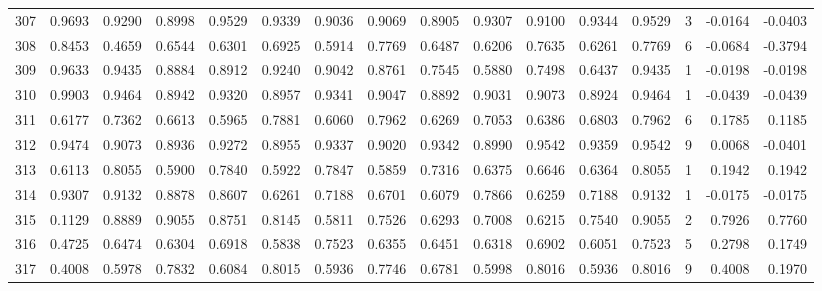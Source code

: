 \begin{tabular}{lrrrrrrrrrrrrrrr}
307 &      0.9693 &  0.9290 &  0.8998 &  0.9529 &  0.9339 &  0.9036 &  0.9069 &  0.8905 &  0.9307 &  0.9100 &   0.9344 &     0.9529 &      3 &                   -0.0164 &                    -0.0403 \\
308 &      0.8453 &  0.4659 &  0.6544 &  0.6301 &  0.6925 &  0.5914 &  0.7769 &  0.6487 &  0.6206 &  0.7635 &   0.6261 &     0.7769 &      6 &                   -0.0684 &                    -0.3794 \\
309 &      0.9633 &  0.9435 &  0.8884 &  0.8912 &  0.9240 &  0.9042 &  0.8761 &  0.7545 &  0.5880 &  0.7498 &   0.6437 &     0.9435 &      1 &                   -0.0198 &                    -0.0198 \\
310 &      0.9903 &  0.9464 &  0.8942 &  0.9320 &  0.8957 &  0.9341 &  0.9047 &  0.8892 &  0.9031 &  0.9073 &   0.8924 &     0.9464 &      1 &                   -0.0439 &                    -0.0439 \\
311 &      0.6177 &  0.7362 &  0.6613 &  0.5965 &  0.7881 &  0.6060 &  0.7962 &  0.6269 &  0.7053 &  0.6386 &   0.6803 &     0.7962 &      6 &                    0.1785 &                     0.1185 \\
312 &      0.9474 &  0.9073 &  0.8936 &  0.9272 &  0.8955 &  0.9337 &  0.9020 &  0.9342 &  0.8990 &  0.9542 &   0.9359 &     0.9542 &      9 &                    0.0068 &                    -0.0401 \\
313 &      0.6113 &  0.8055 &  0.5900 &  0.7840 &  0.5922 &  0.7847 &  0.5859 &  0.7316 &  0.6375 &  0.6646 &   0.6364 &     0.8055 &      1 &                    0.1942 &                     0.1942 \\
314 &      0.9307 &  0.9132 &  0.8878 &  0.8607 &  0.6261 &  0.7188 &  0.6701 &  0.6079 &  0.7866 &  0.6259 &   0.7188 &     0.9132 &      1 &                   -0.0175 &                    -0.0175 \\
315 &      0.1129 &  0.8889 &  0.9055 &  0.8751 &  0.8145 &  0.5811 &  0.7526 &  0.6293 &  0.7008 &  0.6215 &   0.7540 &     0.9055 &      2 &                    0.7926 &                     0.7760 \\
316 &      0.4725 &  0.6474 &  0.6304 &  0.6918 &  0.5838 &  0.7523 &  0.6355 &  0.6451 &  0.6318 &  0.6902 &   0.6051 &     0.7523 &      5 &                    0.2798 &                     0.1749 \\
317 &      0.4008 &  0.5978 &  0.7832 &  0.6084 &  0.8015 &  0.5936 &  0.7746 &  0.6781 &  0.5998 &  0.8016 &   0.5936 &     0.8016 &      9 &                    0.4008 &                     0.1970 \\

\end{tabular}
